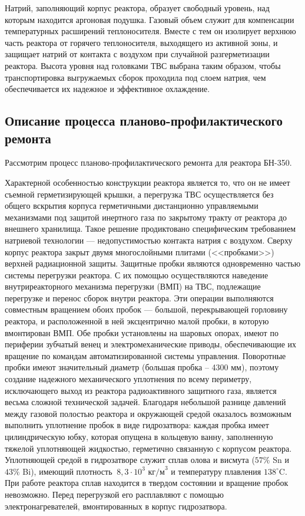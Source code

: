 Натрий, заполняющий корпус реактора, образует свободный уровень, над которым находится аргоновая подушка.
Газовый объем служит для компенсации температурных расширений теплоносителя.
Вместе с тем он изолирует верхнюю часть реактора от горячего теплоносителя, выходящего из активной зоны, и защищает натрий от контакта с воздухом при случайной разгерметизации реактора.
Высота уровня над головками ТВС выбрана таким образом, чтобы транспортировка выгружаемых сборок проходила под слоем натрия, чем обеспечивается их надежное и эффективное охлаждение.
\cite{BH}

\subsection{Описание процесса планово-профилактического ремонта}\label{BN-PPM}

Рассмотрим процесс планово-профилактического ремонта для реактора БН-350.

Характерной особенностью конструкции реактора является то, что он не имеет съемной герметизирующей крышки, а перегрузка ТВС осуществляется без общего вскрытия корпуса герметичными дистанционно управляемыми механизмами под защитой инертного газа по закрытому тракту от реактора до внешнего хранилища.
Такое решение продиктовано специфическим требованием натриевой технологии --- недопустимостью контакта натрия с воздухом.
Сверху корпус реактора закрыт двумя многослойными плитами (<<пробками>>) верхней радиационной защиты.
Защитные пробки являются одновременно частью системы перегрузки реактора.
С их помощью осуществляются наведение внутриреакторного механизма перегрузки (ВМП) на ТВС, подлежащие перегрузке и перенос сборок внутри реактора. 
Эти операции выполняются совместным вращением обоих пробок --- большой, перекрывающей горловину реактора, и расположенной в ней эксцентрично малой пробки, в которую вмонтирован ВМП.
Обе пробки установлены на шаровых опорах, имеют по периферии зубчатый венец и электромеханические приводы, обеспечивающие их вращение по командам автоматизированной системы управления.
Поворотные пробки имеют значительный диаметр (большая пробка -- 4300 мм), поэтому создание надежного механического уплотнения по всему периметру, исключающего выход из реактора радиоактивного защитного газа, является весьма сложной технической задачей.
Благодаря небольшой разнице давлений между газовой полостью реактора и окружающей средой оказалось возможным выполнить уплотнение пробок в виде гидрозатвора: каждая пробка имеет цилиндрическую юбку, которая опущена в кольцевую ванну, заполненную тяжелой уплотняющей жидкостью, герметично связанную с корпусом реактора.
Уплотняющей средой в гидрозатворе служит сплав олова и висмута ($57\%$ Sn и $43\%$ Bi), имеющий плотность $~8,3\cdot10^3 \text{~кг/м}^3$ и температуру плавления $138^{\circ}\text{C}$.
При работе реактора сплав находится в твердом состоянии и вращение пробок невозможно.
Перед перегрузкой его расплавляют с помощью электронагревателей, вмонтированных в корпус гидрозатвора.

